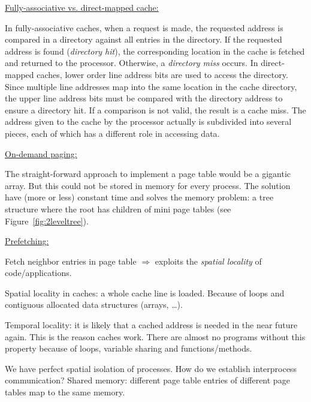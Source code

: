 {{{\begin{itemize}
			\end{itemize}
		}
		\par{
			\noindent\underline{Fully-associative vs. direct-mapped cache:}
			\par{
				\noindent
				In fully-associative caches, when a request is made, the requested address is compared in a directory against all entries in the directory. If the requested address is found (\textit{directory hit}), the corresponding location in the cache is fetched and returned to the processor. Otherwise, a \textit{directory miss} occurs. \newline
				In direct-mapped caches, lower order line address bits are used to access the directory. Since multiple line addresses map into the same location in the cache directory, the upper line address bits must be compared with the directory address to ensure a directory hit. If a comparison is not valid, the result is a cache miss. The address given to the cache by the processor actually is subdivided into several pieces, each of which has a different role in accessing data.
			}
		}
	}
}
\par{
	\noindent\underline{On-demand paging:}
	\par{
		\noindent
		The straight-forward approach to implement a page table would be a gigantic array. But this could not be stored in memory for every process. The solution have (more or less) constant time and solves the memory problem: a tree structure where the root has children of mini page tables (see Figure~\ref{fig:2leveltree}).
	}
}
\par{
	\noindent\underline{Prefetching:}
	\par{
		\noindent
		Fetch neighbor entries in page table $\Rightarrow$ exploits the \textit{spatial locality} of code/applications.
	}
	\par{
		\noindent
		Spatial locality in caches: a whole cache line is loaded. Because of loops and contiguous allocated data structures (arrays, \ldots).
	}
	\par{
		\noindent
		Temporal locality: it is likely that a cached address is needed in the near future again. This is the reason caches work. There are almost no programs without this property because of loops, variable sharing and functions/methods.
	}
}
\par{
	\noindent
	We have perfect spatial isolation of processes. How do we establish interprocess communication? \newline
	Shared memory: different page table entries of different page tables map to the same memory.
}
